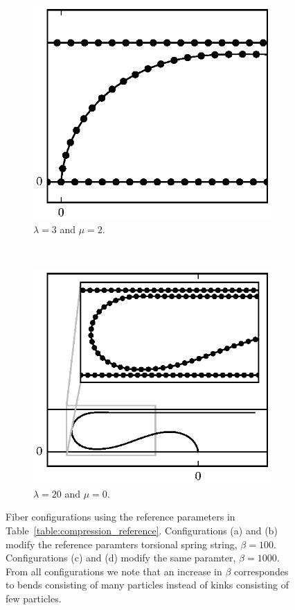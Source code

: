 \begin{figure}
		\begin{subfigure}{.5\textwidth}
			\centering
			\includegraphics{./fig/ch3/push/b1000/l3_m2.eps}
			\caption{$\lambda=3$ and $\mu=2$.\label{subfig:curved}}
		\end{subfigure}%
		~	
		\begin{subfigure}{.5\textwidth}
			\centering
			\includegraphics{./fig/ch3/push/b1000/l20_m0.eps}
			\caption{$\lambda=20$ and $\mu=0$.\label{subfig:long_loop}}
		\end{subfigure}	
		\caption{Fiber configurations using the reference parameters in Table~\ref{table:compression_reference}. Configurations (a) and (b) modify the reference paramters torsional spring string, $\beta=100$. Configurations (c) and (d) modify the same paramter, $\beta=1000$. From all configurations we note that an increase in $\beta$ correspondes to bends consisting of many particles instead of kinks consisting of few particles.\label{fig:bending_fiber}}	
	\end{figure}

